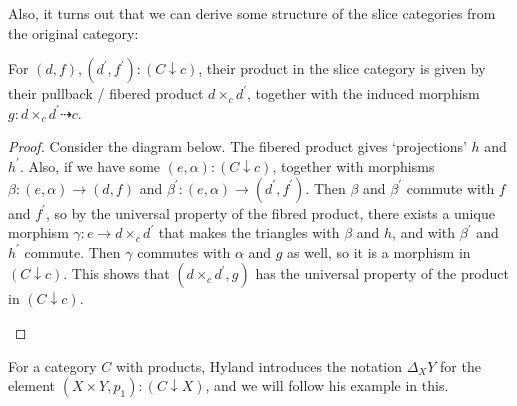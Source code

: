 Also, it turns out that we can derive some structure of the slice categories from the original category:
\begin{lemma}
  For $ (d, f), (d^\prime, f^\prime) : (C \downarrow c) $, their product in the slice category is given by their pullback / fibered product $ d \times_c d^\prime $, together with the induced morphism $ g: d \times_c d^\prime \dasharrow c $.
\end{lemma}
\begin{proof}
  Consider the diagram below. The fibered product gives `projections' $ h $ and $ h^\prime $. Also, if we have some $ (e, \alpha) : (C \downarrow c) $, together with morphisms $ \beta : (e, \alpha) \to (d, f) $ and $ \beta^\prime : (e, \alpha) \to (d^\prime, f^\prime) $. Then $ \beta $ and $ \beta^\prime $ commute with $ f $ and $ f^\prime $, so by the universal property of the fibred product, there exists a unique morphism $ \gamma : e \to d \times_c d^\prime $ that makes the triangles with $ \beta $ and $ h $, and with $ \beta^\prime $ and $ h^\prime $ commute. Then $ \gamma $ commutes with $ \alpha $ and $ g $ as well, so it is a morphism in $ (C \downarrow c) $. This shows that $ (d \times_c d^\prime, g) $ has the universal property of the product in $ (C \downarrow c) $.
  \begin{center}
  \end{center}
\end{proof}

For a category $ C $ with products, Hyland introduces the notation $ \Delta_X Y $ for the element $ (X \times Y, p_1) : (C \downarrow X) $, and we will follow his example in this.

